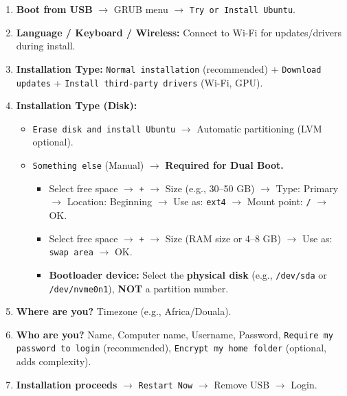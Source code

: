 \documentclass[11pt]{article}
\begin{document}
\begin{experience}
\begin{enumerate}
    \item \textbf{Boot from USB} $\rightarrow$ GRUB menu $\rightarrow$ \texttt{Try or Install Ubuntu}.
    \item \textbf{Language / Keyboard / Wireless:} Connect to Wi-Fi for updates/drivers during install.
    \item \textbf{Installation Type:} \texttt{Normal installation} (recommended) + \texttt{Download updates} + \texttt{Install third-party drivers} (Wi-Fi, GPU).
    \item \textbf{Installation Type (Disk):}
        \begin{itemize}
            \item \texttt{Erase disk and install Ubuntu} $\rightarrow$ Automatic partitioning (LVM optional).
            \item \texttt{Something else} (Manual) $\rightarrow$ \textbf{Required for Dual Boot.}
                \begin{itemize}
                    \item Select free space $\rightarrow$ \texttt{+} $\rightarrow$ Size (e.g., 30--50 GB) $\rightarrow$ Type: Primary $\rightarrow$ Location: Beginning $\rightarrow$ Use as: \texttt{ext4} $\rightarrow$ Mount point: \texttt{/} $\rightarrow$ OK.
                    \item Select free space $\rightarrow$ \texttt{+} $\rightarrow$ Size (RAM size or 4--8 GB) $\rightarrow$ Use as: \texttt{swap area} $\rightarrow$ OK.
                    \item \textbf{Bootloader device:} Select the \textbf{physical disk} (e.g., \texttt{/dev/sda} or \texttt{/dev/nvme0n1}), \textbf{NOT} a partition number.
                \end{itemize}
        \end{itemize}
    \item \textbf{Where are you?} Timezone (e.g., Africa/Douala).
    \item \textbf{Who are you?} Name, Computer name, Username, Password, \texttt{Require my password to login} (recommended), \texttt{Encrypt my home folder} (optional, adds complexity).
    \item \textbf{Installation proceeds} $\rightarrow$ \texttt{Restart Now} $\rightarrow$ Remove USB $\rightarrow$ Login.
\end{enumerate}
\end{experience}
\end{document}
